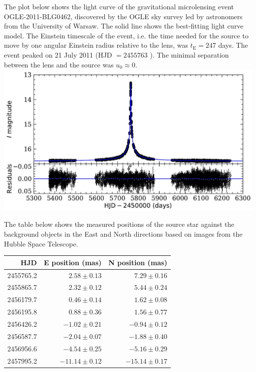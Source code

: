 \documentclass[10pt]{article}
\begin{document}
The plot below shows the light curve of the gravitational microlensing event OGLE-2011-BLG0462, discovered by the OGLE sky survey led by astronomers from the University of Warsaw. The solid line shows the best-fitting light curve model. The Einstein timescale of the event, i.e. the time needed for the source to move by one angular Einstein radius relative to the lens, was $t_{\mathrm{E}}=247$ days. The event peaked on 21 July 2011 (HJD $=2455763$ ). The minimal separation between the lens and the source was $u_{0} \approx 0$.\\
\includegraphics[max width=\textwidth, center]{2025_09_11_2a6858dd99d789184a35g-07}

The table below shows the measured positions of the source star against the background objects in the East and North directions based on images from the Hubble Space Telescope.

\begin{center}
\begin{tabular}{rrr}
\hline\hline
HJD & E position (mas) & N position (mas) \\
\hline
2455765.2 & $2.58 \pm 0.13$ & $7.29 \pm 0.16$ \\
2455865.7 & $2.32 \pm 0.12$ & $5.44 \pm 0.24$ \\
2456179.7 & $0.46 \pm 0.14$ & $1.62 \pm 0.08$ \\
2456195.8 & $0.88 \pm 0.36$ & $1.56 \pm 0.77$ \\
2456426.2 & $-1.02 \pm 0.21$ & $-0.94 \pm 0.12$ \\
2456587.7 & $-2.04 \pm 0.07$ & $-1.88 \pm 0.40$ \\
2456956.6 & $-4.54 \pm 0.25$ & $-5.16 \pm 0.29$ \\
2457995.2 & $-11.14 \pm 0.12$ & $-15.14 \pm 0.17$ \\
\hline
\end{tabular}
\end{center}
\end{document}
